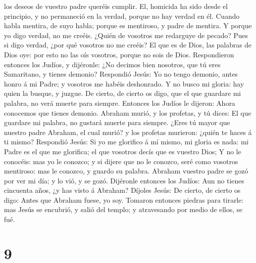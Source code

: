 los deseos de vuestro padre queréis cumplir. El, homicida ha sido desde
el principio, y no permaneció en la verdad, porque no hay verdad en él.
Cuando habla mentira, de suyo habla; porque es mentiroso, y padre de
mentira.  Y porque yo digo verdad, no me creéis.
 ¿Quién de vosotros me redarguye de pecado? Pues si digo
verdad, ¿por qué vosotros no me creéis?  El que es de
Dios, las palabras de Dios oye: por esto no las oís vosotros, porque no
sois de Dios.  Respondieron entonces los Judíos, y
dijéronle: ¿No decimos bien nosotros, que tú eres Samaritano, y tienes
demonio?  Respondió Jesús: Yo no tengo demonio, antes
honro á mi Padre; y vosotros me habéis deshonrado.  Y no
busco mi gloria: hay quien la busque, y juzgue.  De
cierto, de cierto os digo, que el que guardare mi palabra, no verá
muerte para siempre.  Entonces los Judíos le dijeron:
Ahora conocemos que tienes demonio. Abraham murió, y los profetas, y tú
dices: El que guardare mi palabra, no gustará muerte para siempre.
 ¿Eres tú mayor que nuestro padre Abraham, el cual murió?
y los profetas murieron: ¿quién te haces á ti mismo? 
Respondió Jesús: Si yo me glorifico á mí mismo, mi gloria es nada: mi
Padre es el que me glorifica; el que vosotros decís que es vuestro Dios;
 Y no le conocéis: mas yo le conozco; y si dijere que no
le conozco, seré como vosotros mentiroso: mas le conozco, y guardo su
palabra.  Abraham vuestro padre se gozó por ver mi día; y
lo vió, y se gozó.  Dijéronle entonces los Judíos: Aun no
tienes cincuenta años, ¿y has visto á Abraham?  Díjoles
Jesús: De cierto, de cierto os digo: Antes que Abraham fuese, yo soy.
 Tomaron entonces piedras para tirarle: mas Jesús se
encubrió, y salió del templo; y atravesando por medio de ellos, se fué.

\hypertarget{section-8}{%
\section{9}\label{section-8}}

